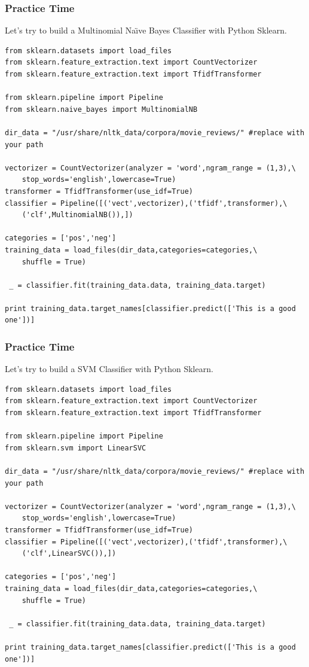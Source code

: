\documentclass[serif,11pt,aspectratio=1610,table]{beamer}
\begin{document}
\begin{frame}[fragile]
 \frametitle{Practice Time}
\footnotesize
Let's try to build a Multinomial Na\"{\i}ve Bayes Classifier with Python Sklearn.
\tiny
\begin{verbatim}
from sklearn.datasets import load_files
from sklearn.feature_extraction.text import CountVectorizer
from sklearn.feature_extraction.text import TfidfTransformer

from sklearn.pipeline import Pipeline
from sklearn.naive_bayes import MultinomialNB

dir_data = "/usr/share/nltk_data/corpora/movie_reviews/" #replace with your path

vectorizer = CountVectorizer(analyzer = 'word',ngram_range = (1,3),\
    stop_words='english',lowercase=True)
transformer = TfidfTransformer(use_idf=True)
classifier = Pipeline([('vect',vectorizer),('tfidf',transformer),\
    ('clf',MultinomialNB()),])

categories = ['pos','neg']
training_data = load_files(dir_data,categories=categories,\
    shuffle = True)

 _ = classifier.fit(training_data.data, training_data.target)

print training_data.target_names[classifier.predict(['This is a good one'])]
\end{verbatim}

\end{frame}


\begin{frame}[fragile]
 \frametitle{Practice Time}
\footnotesize
Let's try to build a SVM Classifier with Python Sklearn.
\tiny
\begin{verbatim}
from sklearn.datasets import load_files
from sklearn.feature_extraction.text import CountVectorizer
from sklearn.feature_extraction.text import TfidfTransformer

from sklearn.pipeline import Pipeline
from sklearn.svm import LinearSVC

dir_data = "/usr/share/nltk_data/corpora/movie_reviews/" #replace with your path

vectorizer = CountVectorizer(analyzer = 'word',ngram_range = (1,3),\
    stop_words='english',lowercase=True)
transformer = TfidfTransformer(use_idf=True)
classifier = Pipeline([('vect',vectorizer),('tfidf',transformer),\
    ('clf',LinearSVC()),])

categories = ['pos','neg']
training_data = load_files(dir_data,categories=categories,\
    shuffle = True)

 _ = classifier.fit(training_data.data, training_data.target)

print training_data.target_names[classifier.predict(['This is a good one'])]
\end{verbatim}

\end{frame}
\end{document}

